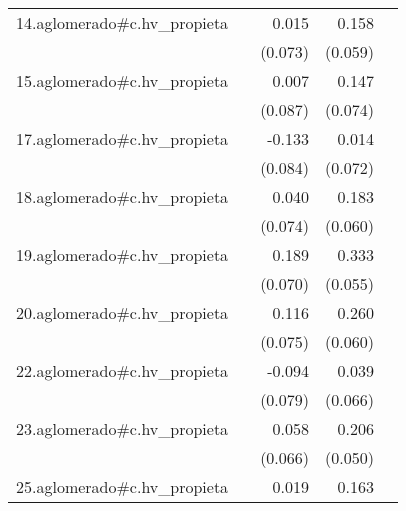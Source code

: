 {\begin{longtable}{l*{4}{D{.}{.}{-1}}}
\addlinespace
14.aglomerado#c.hv\_propieta&                     &       0.015         &       0.158\sym{**} &                     \\
            &                     &     (0.073)         &     (0.059)         &                     \\
\addlinespace
15.aglomerado#c.hv\_propieta&                     &       0.007         &       0.147\sym{*}  &                     \\
            &                     &     (0.087)         &     (0.074)         &                     \\
\addlinespace
17.aglomerado#c.hv\_propieta&                     &      -0.133         &       0.014         &                     \\
            &                     &     (0.084)         &     (0.072)         &                     \\
\addlinespace
18.aglomerado#c.hv\_propieta&                     &       0.040         &       0.183\sym{**} &                     \\
            &                     &     (0.074)         &     (0.060)         &                     \\
\addlinespace
19.aglomerado#c.hv\_propieta&                     &       0.189\sym{**} &       0.333\sym{***}&                     \\
            &                     &     (0.070)         &     (0.055)         &                     \\
\addlinespace
20.aglomerado#c.hv\_propieta&                     &       0.116         &       0.260\sym{***}&                     \\
            &                     &     (0.075)         &     (0.060)         &                     \\
\addlinespace
22.aglomerado#c.hv\_propieta&                     &      -0.094         &       0.039         &                     \\
            &                     &     (0.079)         &     (0.066)         &                     \\
\addlinespace
23.aglomerado#c.hv\_propieta&                     &       0.058         &       0.206\sym{***}&                     \\
            &                     &     (0.066)         &     (0.050)         &                     \\
\addlinespace
25.aglomerado#c.hv\_propieta&                     &       0.019         &       0.163\sym{*}  &                     \\

\end{longtable}}
